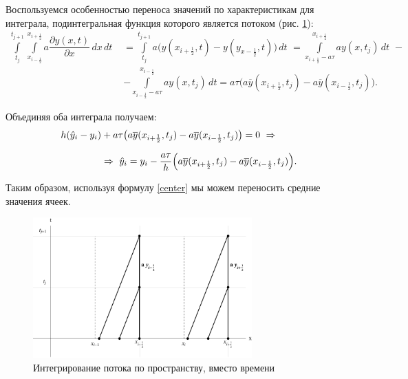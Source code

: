 \documentclass[12pt,a4paper]{article}
\newcommand{\picref}[1]{рис. \ref{#1}}
\newcommand{\half}{\frac{1}{2}}
\begin{document}
    Воспользуемся особенностью переноса значений по характеристикам для интеграла, подинтегральная функция которого является потоком (\picref{fig:flow_visual}):
    \[
        \begin{split}
            \int \limits_{t_j}^{t_{j+1}} \int \limits_{x_{i-\half}}^{x_{i+\half}} a \dfrac{ \partial y(x,t) }{ \partial x } \, dx \, dt \,\, &= \int \limits_{t_j}^{t_{j+1}} a \bigl( y(x_{i+\half}, t) - y(y_{x-\half}, t) \bigr) \, dt \,\, =  \int \limits_{x_{i+\half}-a\tau}^{x_{i+\half}} a y(x, t_j) \, dt \,\, - \\
            &- \int \limits_{x_{i-\half}-a\tau}^{x_{i-\half}} a y(x, t_j) \, dt = a\tau\bigl( a \overline y(x_{i+\half}, t_j) - a \overline y(x_{i-\half}, t_j) \bigr).
        \end{split}
    \]

    Объединяя оба интеграла получаем:
    \begin{equation}
        \begin{split}
            h ( \hat y_i - y_i) &+ a\tau\bigl( a \overline y(x_{i+\half}, t_j) - a \overline y(x_{i-\half}, t_j) \bigr) = 0 \,\, \Rightarrow \\[0.7em]
            &\Rightarrow \,\, \hat y_i = y_i - \dfrac{ a\tau }{ h } \Bigl( a \overline y(x_{i+\half}, t_j) - a \overline y(x_{i-\half}, t_j) \Bigr).
        \end{split}
        \label{center}
    \end{equation}

    Таким образом, используя формулу \eqref{center} мы можем переносить средние значения ячеек.

    \pagebreak

    \begin{figure}[h]
        \centering
        \includegraphics[width=0.75\textwidth]{flow_visual.pdf}
        \caption{Интегрирование потока по пространству, вместо времени}
        \label{fig:flow_visual}
    \end{figure}
\end{document}
